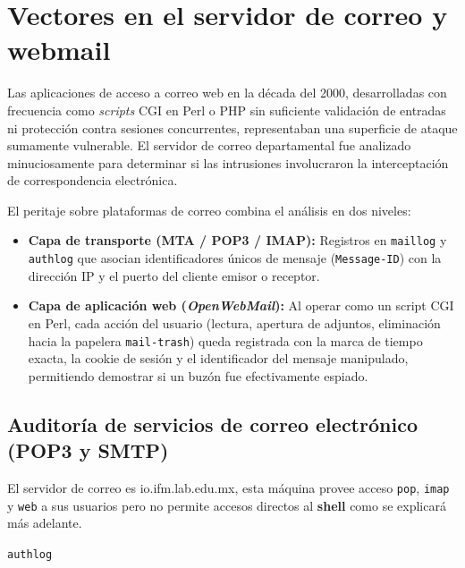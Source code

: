 \chapter{Vectores en el servidor de correo y webmail}
\label{cap:servidor_correo_webmail}

Las aplicaciones de acceso a correo web en la década del 2000, desarrolladas con frecuencia como \textit{scripts} CGI en Perl o PHP sin suficiente validación de entradas ni protección contra sesiones concurrentes, representaban una superficie de ataque sumamente vulnerable. El servidor de correo departamental fue analizado minuciosamente para determinar si las intrusiones involucraron la interceptación de correspondencia electrónica.

\begin{notaforense}
El peritaje sobre plataformas de correo combina el análisis en dos niveles:
\begin{itemize}
    \item \textbf{Capa de transporte (MTA / POP3 / IMAP):} Registros en \texttt{maillog} y \texttt{authlog} que asocian identificadores únicos de mensaje (\texttt{Message-ID}) con la dirección IP y el puerto del cliente emisor o receptor.
    \item \textbf{Capa de aplicación web (\textit{OpenWebMail}):} Al operar como un script CGI en Perl, cada acción del usuario (lectura, apertura de adjuntos, eliminación hacia la papelera \texttt{mail-trash}) queda registrada con la marca de tiempo exacta, la cookie de sesión y el identificador del mensaje manipulado, permitiendo demostrar si un buzón fue efectivamente espiado.
\end{itemize}
\end{notaforense}

\section{Auditoría de servicios de correo electrónico (POP3 y SMTP)}
 

 El servidor de correo es io.ifm.lab.edu.mx, esta máquina provee acceso
\texttt{pop}, \texttt{imap} y \texttt{web} a sus usuarios pero no permite accesos directos al
\textbf{shell} como se explicará más adelante.

\texttt{authlog}
 
\vspace{1em}

